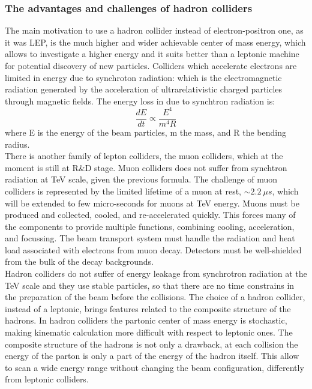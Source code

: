 \subsubsection{The advantages and challenges of hadron colliders}
The main motivation to use a hadron collider instead of electron-positron one, as it was LEP, is the much higher and wider achievable center of mass energy, which allows to investigate a higher energy and it suits better than a leptonic machine for potential discovery of new particles. Colliders which accelerate electrons are limited in energy due to synchroton radiation: which is the electromagnetic radiation generated by the acceleration of ultrarelativistic charged particles through magnetic fields. The energy loss in due to synchtron radiation is:
\begin{equation}
\label{eq:synchrad}
\frac{dE}{dt} \propto \frac{E^4}{m^4R}
\end{equation}
where E is the energy of the beam particles, m the mass, and R the bending radius.\\
There is another family of lepton colliders, the muon colliders, which at the moment is still at R\&D stage. Muon colliders does not suffer from synchtron radiation at TeV scale, given the previous formula. The challenge of muon colliders is represented by the limited lifetime of a muon at rest, $\sim2.2~\mu s$, which will be extended to few micro-seconds for muons at TeV energy. Muons must be produced and collected, cooled, and re-accelerated quickly. This forces many of the components to provide multiple functions, combining cooling, acceleration, and focussing. The beam transport system must handle the radiation and heat load associated with electrons from muon decay. Detectors must be well-shielded from the bulk of the decay backgrounds.\\
Hadron colliders do not suffer of energy leakage from synchrotron radiation at the TeV scale and they use stable particles, so that there are no time constrains in the preparation of the beam before the collisions. 
The choice of a hadron collider, instead of a leptonic, brings features related to the composite structure of the hadrons.
In hadron colliders the partonic center of mass energy is stochastic, making kinematic calculation more difficult with respect to leptonic ones. The composite structure of the hadrons is not only a drawback, at each collision the energy of the parton is  only a part of the energy of the hadron itself. This allow to scan a wide energy range without changing the beam configuration, differently from leptonic colliders.
